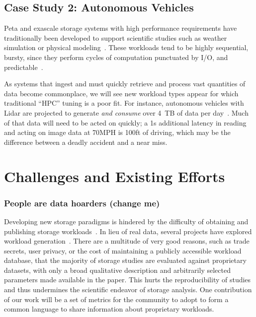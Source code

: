 \subsection{Case Study 2: Autonomous Vehicles}
Peta and exascale storage systems with high performance requirements have
traditionally been developed to support scientific studies such as weather
simulation or physical modeling~\cite{miyoshi2016big,maeno2014evolution}.  These workloads tend to be highly
sequential, bursty, since they perform cycles of computation punctuated by I/O,
and predictable~\cite{liufast14}.  

As systems that ingest and must quickly retrieve and process vast quantities of
data become commonplace, we will see new workload types appear for which traditional
``HPC'' tuning is a poor fit.  For instance, autonomous vehicles with Lidar
are projected to generate \textit{and consume} over 4~TB of data per
day~\cite{selfdrivingcars}.  Much of that data will need to be acted on quickly; a 1s
additional latency in reading and acting on image data at 70MPH is 100ft of driving, which may be the difference
between a deadly accident and a near miss. 
%


\section{Challenges and Existing Efforts}%
\label{sec:challenges}


\subsubsection*{People are data hoarders (change me)}
Developing new storage paradigms is hindered by the difficulty of obtaining and
publishing storage workloads~\cite{ian-tos}. In lieu of real data, several projects
have explored workload
generation~\cite{tarasov2012extracting,ganger1995generating,kurmas2003synthesizing,gomez2000new}.
There are a multitude of very good reasons, such as trade secrets, user
privacy, or the cost of maintaining a publicly accessible workload database,
that the majority of storage studies are evaluated against proprietary
datasets, with only a broad qualitative description and arbitrarily selected parameters made
available in the paper. This hurts the reproducibility of
studies and thus undermines the scientific endeavor of storage analysis.  One
contribution of our work will be a set of metrics for the community to adopt to
form a common language to share information about proprietary workloads.%

